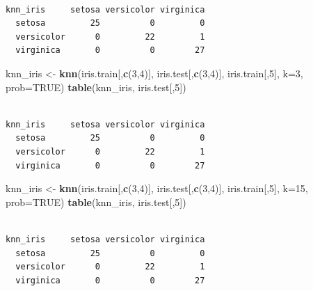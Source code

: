 \documentclass[
]{krantz}
\makeatletter
\newenvironment{Shaded}{\begin{snugshade}}{\end{snugshade}}
\newcommand{\DataTypeTok}[1]{\textcolor[rgb]{0.27,0.27,0.27}{#1}}
\newcommand{\DecValTok}[1]{\textcolor[rgb]{0.06,0.06,0.06}{#1}}
\newcommand{\KeywordTok}[1]{\textcolor[rgb]{0.27,0.27,0.27}{\textbf{#1}}}
\newcommand{\NormalTok}[1]{#1}
\newcommand{\OtherTok}[1]{\textcolor[rgb]{0.37,0.37,0.37}{#1}}
\newcommand{\StringTok}[1]{\textcolor[rgb]{0.5,0.5,0.5}{#1}}
\newenvironment{kframe}{%
\medskip{}
\setlength{\fboxsep}{.8em}
 \def\at@end@of@kframe{}%
 \ifinner\ifhmode%
  \def\at@end@of@kframe{\end{minipage}}%
  \begin{minipage}{\columnwidth}%
 \fi\fi%
 \def\FrameCommand##1{\hskip\@totalleftmargin \hskip-\fboxsep
 \colorbox{shadecolor}{##1}\hskip-\fboxsep
     \hskip-\linewidth \hskip-\@totalleftmargin \hskip\columnwidth}%
 \MakeFramed {\advance\hsize-\width
   \@totalleftmargin\z@ \linewidth\hsize
   \@setminipage}}%
 {\par\unskip\endMakeFramed%
 \at@end@of@kframe}
\renewenvironment{Shaded}{\begin{kframe}}{\end{kframe}}
\makeatother
\begin{document}
\begin{verbatim}
            
knn_iris     setosa versicolor virginica
  setosa         25          0         0
  versicolor      0         22         1
  virginica       0          0        27
\end{verbatim}

\begin{Shaded}
\begin{Highlighting}[]
\NormalTok{knn\_iris \textless{}{-}}\StringTok{ }\KeywordTok{knn}\NormalTok{(iris.train[,}\KeywordTok{c}\NormalTok{(}\DecValTok{3}\NormalTok{,}\DecValTok{4}\NormalTok{)], iris.test[,}\KeywordTok{c}\NormalTok{(}\DecValTok{3}\NormalTok{,}\DecValTok{4}\NormalTok{)], iris.train[,}\DecValTok{5}\NormalTok{], }\DataTypeTok{k=}\DecValTok{3}\NormalTok{, }\DataTypeTok{prob=}\OtherTok{TRUE}\NormalTok{)}
\KeywordTok{table}\NormalTok{(knn\_iris, iris.test[,}\DecValTok{5}\NormalTok{])}
\end{Highlighting}
\end{Shaded}

\begin{verbatim}
            
knn_iris     setosa versicolor virginica
  setosa         25          0         0
  versicolor      0         22         1
  virginica       0          0        27
\end{verbatim}

\begin{Shaded}
\begin{Highlighting}[]
\NormalTok{knn\_iris \textless{}{-}}\StringTok{ }\KeywordTok{knn}\NormalTok{(iris.train[,}\KeywordTok{c}\NormalTok{(}\DecValTok{3}\NormalTok{,}\DecValTok{4}\NormalTok{)], iris.test[,}\KeywordTok{c}\NormalTok{(}\DecValTok{3}\NormalTok{,}\DecValTok{4}\NormalTok{)], iris.train[,}\DecValTok{5}\NormalTok{], }\DataTypeTok{k=}\DecValTok{15}\NormalTok{, }\DataTypeTok{prob=}\OtherTok{TRUE}\NormalTok{)}
\KeywordTok{table}\NormalTok{(knn\_iris, iris.test[,}\DecValTok{5}\NormalTok{])}
\end{Highlighting}
\end{Shaded}

\begin{verbatim}
            
knn_iris     setosa versicolor virginica
  setosa         25          0         0
  versicolor      0         22         1
  virginica       0          0        27
\end{verbatim}
\end{document}
